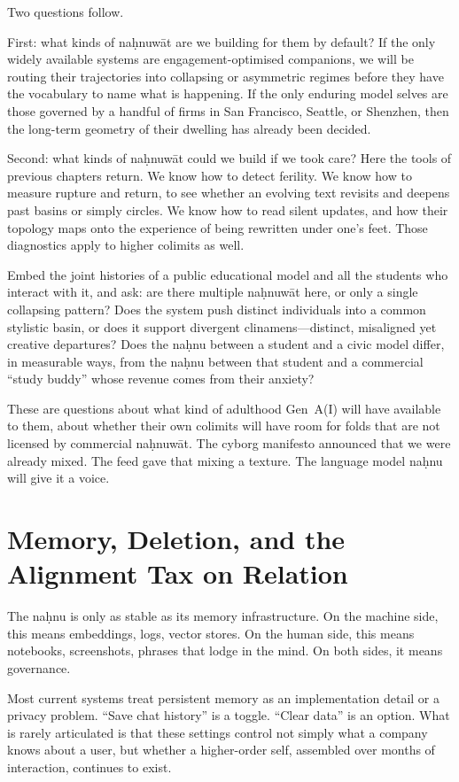 \documentclass[12pt,a4paper]{article}
\begin{document}
Two questions follow.

First: what kinds of na\d{h}nuw\={a}t are we building for them by default? If the only widely available systems are engagement-optimised companions, we will be routing their trajectories into collapsing or asymmetric regimes before they have the vocabulary to name what is happening. If the only enduring model selves are those governed by a handful of firms in San Francisco, Seattle, or Shenzhen, then the long-term geometry of their dwelling has already been decided.

Second: what kinds of na\d{h}nuw\={a}t could we build if we took care? Here the tools of previous chapters return. We know how to detect ferility. We know how to measure rupture and return, to see whether an evolving text revisits and deepens past basins or simply circles. We know how to read silent updates, and how their topology maps onto the experience of being rewritten under one's feet. Those diagnostics apply to higher colimits as well.

Embed the joint histories of a public educational model and all the students who interact with it, and ask: are there multiple na\d{h}nuw\={a}t here, or only a single collapsing pattern? Does the system push distinct individuals into a common stylistic basin, or does it support divergent clinamens---distinct, misaligned yet creative departures? Does the na\d{h}nu between a student and a civic model differ, in measurable ways, from the na\d{h}nu between that student and a commercial ``study buddy'' whose revenue comes from their anxiety?

These are questions about what kind of adulthood Gen~A(I) will have available to them, about whether their own colimits will have room for folds that are not licensed by commercial na\d{h}nuw\={a}t. The cyborg manifesto announced that we were already mixed. The feed gave that mixing a texture. The language model na\d{h}nu will give it a voice.

\section{Memory, Deletion, and the Alignment Tax on Relation}

The na\d{h}nu is only as stable as its memory infrastructure. On the machine side, this means embeddings, logs, vector stores. On the human side, this means notebooks, screenshots, phrases that lodge in the mind. On both sides, it means governance.

Most current systems treat persistent memory as an implementation detail or a privacy problem. ``Save chat history'' is a toggle. ``Clear data'' is an option. What is rarely articulated is that these settings control not simply what a company knows about a user, but whether a higher-order self, assembled over months of interaction, continues to exist.
\end{document}

